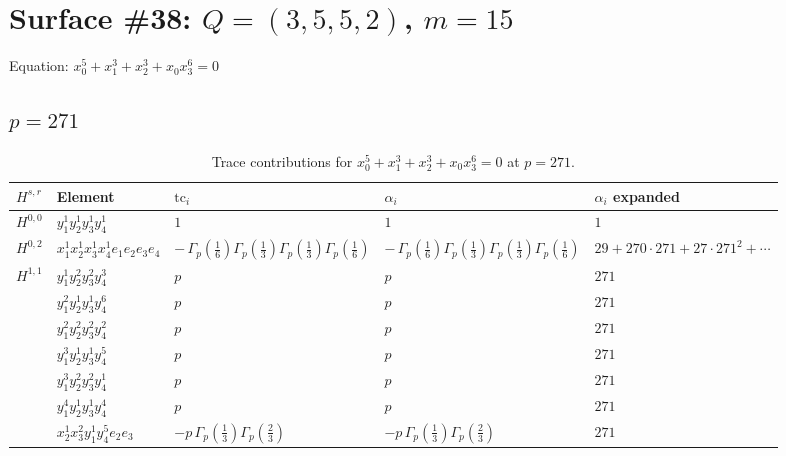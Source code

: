 \documentclass[11pt]{article}
\begin{document}
\newpage

\section*{Surface \#38: $Q=(3, 5, 5, 2)$, $m=15$}

Equation: $x_0^{5} + x_1^{3} + x_2^{3} + x_0 x_3^{6} = 0$

\subsection*{$p = 271$}

\begin{table}[ht]
\centering
\caption{Trace contributions for $x_0^{5} + x_1^{3} + x_2^{3} + x_0 x_3^{6} = 0$ at $p=271$.}\label{tab:deformed-38}
\renewcommand{\arraystretch}{1.1}
{\scriptsize
\begin{tabular}{@{}lllll@{}}
\toprule
$H^{s,r}$ & Element & $\mathrm{tc}_i$ & $\alpha_i$ & $\alpha_i$ expanded \\
\midrule
$H^{0,0}$ & $y_{1}^{1} y_{2}^{1} y_{3}^{1} y_{4}^{1}$ & $1$ & $1$ & $1$ \\
\midrule
$H^{0,2}$ & $x_{1}^{1} x_{2}^{1} x_{3}^{1} x_{4}^{1}  e_{1} e_{2} e_{3} e_{4}$ & $- \, \Gamma_p \left( \frac{1}{6} \right) \Gamma_p \left( \frac{1}{3} \right) \Gamma_p \left( \frac{1}{3} \right) \Gamma_p \left( \frac{1}{6} \right)$ & $- \, \Gamma_p \left( \frac{1}{6} \right) \Gamma_p \left( \frac{1}{3} \right) \Gamma_p \left( \frac{1}{3} \right) \Gamma_p \left( \frac{1}{6} \right)$ & $29{+}270{\cdot}271{+}27{\cdot}271^{2}{+}\cdots$ \\
\midrule
$H^{1,1}$ & $y_{1}^{1} y_{2}^{2} y_{3}^{2} y_{4}^{3}$ & $p \,$ & $p \,$ & $271$ \\
 & $y_{1}^{2} y_{2}^{1} y_{3}^{1} y_{4}^{6}$ & $p \,$ & $p \,$ & $271$ \\
 & $y_{1}^{2} y_{2}^{2} y_{3}^{2} y_{4}^{2}$ & $p \,$ & $p \,$ & $271$ \\
 & $y_{1}^{3} y_{2}^{1} y_{3}^{1} y_{4}^{5}$ & $p \,$ & $p \,$ & $271$ \\
 & $y_{1}^{3} y_{2}^{2} y_{3}^{2} y_{4}^{1}$ & $p \,$ & $p \,$ & $271$ \\
 & $y_{1}^{4} y_{2}^{1} y_{3}^{1} y_{4}^{4}$ & $p \,$ & $p \,$ & $271$ \\
 & $x_{2}^{1} x_{3}^{2} y_{1}^{1} y_{4}^{5} e_{2} e_{3}$ & $- p \, \Gamma_p \left( \frac{1}{3} \right) \Gamma_p \left( \frac{2}{3} \right)$ & $- p \, \Gamma_p \left( \frac{1}{3} \right) \Gamma_p \left( \frac{2}{3} \right)$ & $271$ \\

\end{tabular}}
\end{table}
\end{document}
